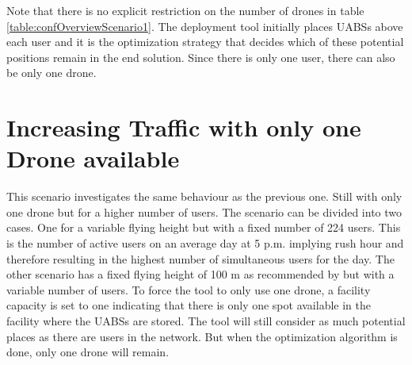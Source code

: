 Note that there is no explicit restriction on the number of drones in table \ref{table:confOverviewScenario1}. The deployment tool initially places 
\gls{UABS}s above each user and it is the optimization strategy that decides which of these potential positions remain in the end solution.
Since there is only one user, there can also be only one drone.




\section{Increasing Traffic with only one Drone available}

This scenario investigates the same behaviour  as the previous one. Still with only one drone but for a higher number of users. 
The scenario can be divided into two cases. One for a variable 
flying height but with a fixed number of 224 users. This is the number of active users on an average day at 5 p.m. implying rush hour and therefore 
resulting in the highest number of simultaneous users for the day\cite{J2}. The other 
scenario has a fixed flying height of 100 m as recommended by \cite{J2} but with a variable number of users. To force the tool to only use one drone, a facility capacity is set to one 
indicating that there is only one spot available in the facility where the \gls{UABS}s are stored. The tool will still consider as much potential places 
as there are users in the network. But when the optimization algorithm is done, only one drone will remain.

